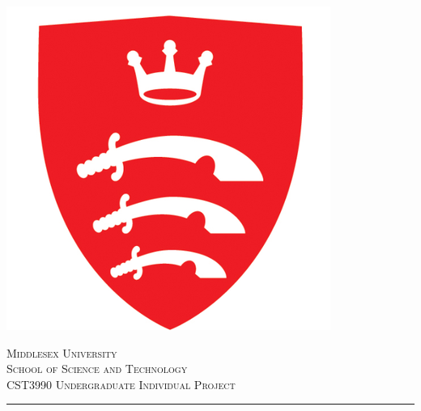 \documentclass{article}
\begin{document}

\begin{titlepage} %
	\newcommand{\HRule}{\rule{\linewidth}{0.5mm}} %
	
	\center %
	
	
	
    \includegraphics[scale= 0.35]{img/logo.png}
    \bigskip
    
	\textsc{\LARGE Middlesex University}\\[1.5cm] %
	
	\textsc{\Large School of Science and Technology}\\[0.5cm] %
	
	\textsc{\large CST3990 Undergraduate Individual Project}\\[0.5cm] %
	
	
	\HRule\\[0.4cm]
	

\end{titlepage}
\end{document}
